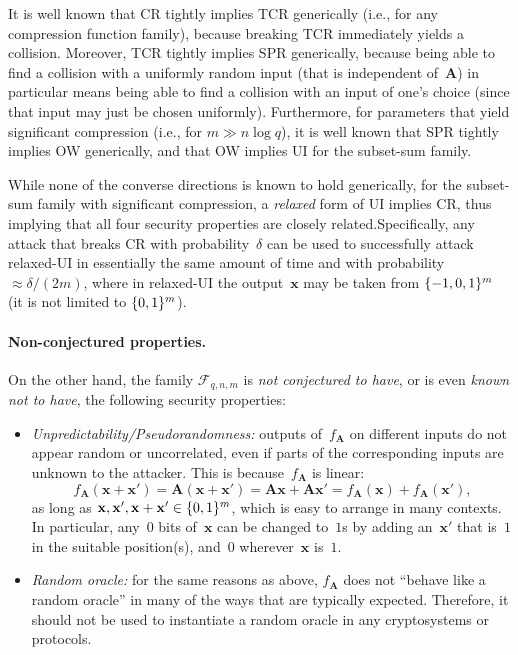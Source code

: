 \documentclass[11pt]{article}
\DeclarePairedDelimiter\set{\{}{\}}
\newcommand{\matA}{\ensuremath{\mathbf{A}}}
\newcommand{\vecx}{\ensuremath{\mathbf{x}}}
\numberwithin{equation}{section}
\newcommand{\bit}{\ensuremath{\set{0,1}}}
\renewcommand{\cal}[1]{\mathcal{#1}}
\begin{document}
It is well known that CR tightly implies TCR generically (i.e., for
any compression function family), because breaking TCR immediately
yields a collision. Moreover, TCR tightly implies SPR generically,
because being able to find a collision with a uniformly random input
(that is independent of~$\matA$) in particular means being able to
find a collision with an input of one's choice (since that input may
just be chosen uniformly). Furthermore, for parameters that yield
significant compression (i.e., for $m \gg n \log q$), it is well known
that SPR tightly implies OW generically, and that OW implies UI for
the subset-sum family.

While none of the converse directions is known to hold generically,
for the subset-sum family with significant compression, a
\emph{relaxed} form of UI implies CR, thus implying that all four
security properties are closely related.\@ Specifically, any attack
that breaks CR with probability~$\delta$ can be used to successfully
attack relaxed-UI in essentially the same amount of time and with
probability $\approx \delta/(2m)$, where in relaxed-UI the
output~$\vecx$ may be taken from $\set{-1,0,1}^{m}$ (it is not limited
to $\bit^{m}$).

\paragraph{Non-conjectured properties.}

On the other hand, the family $\cal F_{q,n,m}$ is \emph{not
  conjectured to have}, or is even \emph{known not to have}, the
following security properties:
\begin{itemize}
\item \emph{Unpredictability/Pseudorandomness:} outputs of~$f_{\matA}$
  on different inputs do not appear random or uncorrelated, even if
  parts of the corresponding inputs are unknown to the attacker. This
  is because~$f_{\matA}$ is linear:
  \[ f_{\matA}(\vecx + \vecx') = \matA(\vecx + \vecx') = \matA \vecx +
    \matA \vecx' = f_{\matA}(\vecx) + f_{\matA}(\vecx') \text{,} \] as
  long as $\vecx, \vecx', \vecx+\vecx' \in \bit^{m}$, which is easy to
  arrange in many contexts. In particular, any~$0$ bits of~$\vecx$ can
  be changed to~$1$s by adding an~$\vecx'$ that is~$1$ in the suitable
  position(s), and~$0$ wherever~$\vecx$ is~$1$.

\item \emph{Random oracle:} for the same reasons as above, $f_{\matA}$
  does not ``behave like a random oracle'' in many of the ways that
  are typically expected. Therefore, it should not be used to
  instantiate a random oracle in any cryptosystems or protocols.
\end{itemize}
\end{document}
